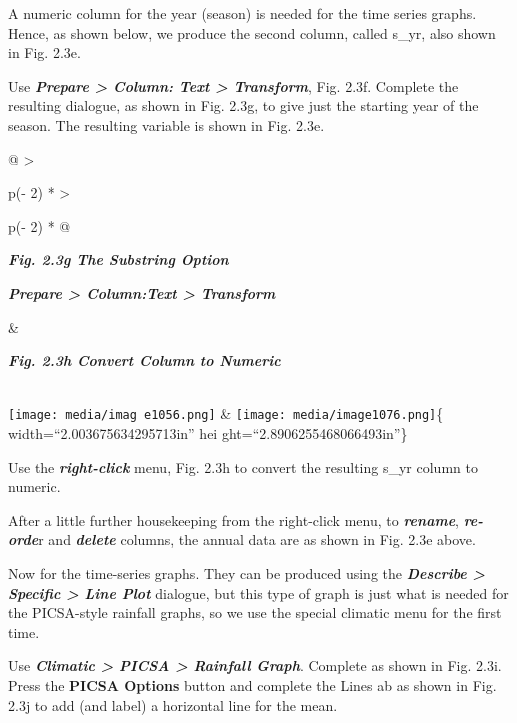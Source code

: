 \documentclass[
  letterpaper,
  DIV=11,
  numbers=noendperiod]{scrreprt}
\begin{document}
A numeric column for the year (season) is needed for the time series
graphs. Hence, as shown below, we produce the second column, called
s\_yr, also shown in Fig. 2.3e.

Use \textbf{\emph{Prepare \textgreater{} Column: Text \textgreater{}
Transform}}, Fig. 2.3f. Complete the resulting dialogue, as shown in
Fig. 2.3g, to give just the starting year of the season. The resulting
variable is shown in Fig. 2.3e.

\begin{longtable}[]{@{}
  >{\raggedright\arraybackslash}p{(\columnwidth - 2\tabcolsep) * }
  >{\raggedright\arraybackslash}p{(\columnwidth - 2\tabcolsep) * }@{}}
\toprule\noalign{}
\begin{minipage}[b]{\linewidth}\raggedright
\textbf{\emph{Fig. 2.3g The Substring Option}}

\textbf{\emph{Prepare \textgreater{} Column:Text \textgreater{}
Transform}}
\end{minipage} & \begin{minipage}[b]{\linewidth}\raggedright
\textbf{\emph{Fig. 2.3h Convert Column to Numeric}}
\end{minipage} \\
\midrule\noalign{}
\endhead
\bottomrule\noalign{}
\endlastfoot
\texttt{[image: media/imag e1056.png]}
& \texttt{[image: media/image1076.png]}\{ width=``2.003675634295713in''
hei ght=``2.8906255468066493in''\} \\
\end{longtable}

Use the \textbf{\emph{right-click}} menu, Fig. 2.3h to convert the
resulting s\_yr column to numeric.

After a little further housekeeping from the right-click menu, to
\textbf{\emph{rename}}, \textbf{\emph{re-orde}}r and
\textbf{\emph{delete}} columns, the annual data are as shown in Fig.
2.3e above.

Now for the time-series graphs. They can be produced using the
\textbf{\emph{Describe \textgreater{} Specific \textgreater{} Line
Plot}} dialogue, but this type of graph is just what is needed for the
PICSA-style rainfall graphs, so we use the special climatic menu for the
first time.

Use \textbf{\emph{Climatic \textgreater{} PICSA \textgreater{} Rainfall
Graph}}. Complete as shown in Fig. 2.3i. Press the \textbf{PICSA
Options} button and complete the Lines ab as shown in Fig. 2.3j to add
(and label) a horizontal line for the mean.
\end{document}
